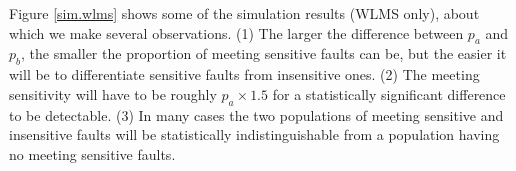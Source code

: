 Figure \ref{sim.wlms} 
shows some of the simulation results (WLMS only), 
about which we make several observations. 
(1) The larger the difference between $p_a$ and $p_b$,
the smaller the proportion of meeting sensitive faults can be,
but the easier it will be to differentiate sensitive faults from 
insensitive ones. 
(2) The meeting sensitivity will have to be roughly 
$p_a \times 1.5$ for a statistically significant difference
to be detectable.
(3) In many cases the two populations of meeting sensitive and insensitive 
faults will be statistically
indistinguishable from a population having no meeting sensitive faults. 

